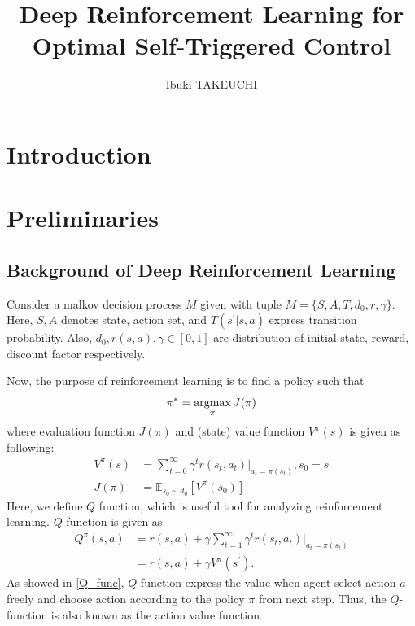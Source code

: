 \documentclass[english, dvipdfmx]{ampmt}             %
\title[Deep Reinforcement Learning for Optimal Self-Triggered Control]
      {Deep Reinforcement Learning for Optimal Self-Triggered Control}
\author{Ibuki TAKEUCHI}
\newcommand{\argmax}{\mathop{\rm argmax}\limits}
\newcommand{\expect}{\mathbb{E}}
\begin{document}
\ifoutputbody
\makeinsidecover                %
\makeabstract                   %
\maketoc                        %
\setcounter{page}{1}
\section{Introduction}



\section{Preliminaries}
\subsection{Background of Deep Reinforcement Learning}
Consider a malkov decision process $M$ given with tuple $M=\{S,A,T,d_0,r,\gamma\}$. Here, $S,A$ denotes state, action set, and $T(s^{'}|s,a)$ express transition probability. Also, $d_0,r(s,a),\gamma\in[0,1]$ are distribution of initial state, reward, discount factor respectively. \par
Now, the purpose of reinforcement learning is to find a policy such that
\begin{equation}
	\pi^{*}=\argmax_{\pi}J(\pi) \label{purpose_of_rl}
\end{equation} 
where evaluation function $J(\pi)$ and (state) value function $V^{\pi}(s)$ is given as following:
\begin{align}
	V^{\pi}(s) &= \sum_{t=0}^{\infty}\gamma^tr(s_t, a_t)|_{a_t=\pi(s_t)}, s_0 = s\\
	J(\pi) &= \expect_{s_0\sim d_0}[V^{\pi}(s_0)]
\end{align}
Here, we define $Q$ function, which is useful tool for analyzing reinforcement learning. $Q$ function is given as 
\begin{align}
	Q^{\pi}(s,a) &= r(s, a) + \gamma\sum_{t=1}^{\infty}\gamma^tr(s_t, a_t)|_{a_t=\pi(s_t)} \nonumber\\
			    &= r(s, a) + \gamma V^{\pi}(s^{\prime}). \label{Q_func}
\end{align}
As showed in \eqref{Q_func}, $Q$ function express the value when agent select action $a$ freely and choose action according to the policy $\pi$ from next step. Thus, the $Q$-function is also known as the action value function.
\end{document}
